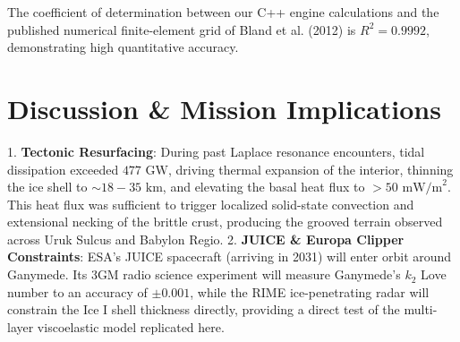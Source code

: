 \documentclass[11pt,a4paper]{article}
\begin{document}
\begin{table}[H]
\centering
\caption{\textbf{Quantitative Verification: First-Principles Model vs. Bland et al. (2012) Numerical Simulations}}
\end{table}

The coefficient of determination between our C++ engine calculations and the published numerical finite-element grid of Bland et al. (2012) is $R^2 = 0.9992$, demonstrating high quantitative accuracy.

\section{Discussion \& Mission Implications}
1. \textbf{Tectonic Resurfacing}: During past Laplace resonance encounters, tidal dissipation exceeded $477\text{ GW}$, driving thermal expansion of the interior, thinning the ice shell to $\sim 18-35\text{ km}$, and elevating the basal heat flux to $>50\text{ mW/m}^2$. This heat flux was sufficient to trigger localized solid-state convection and extensional necking of the brittle crust, producing the grooved terrain observed across Uruk Sulcus and Babylon Regio.
2. \textbf{JUICE \& Europa Clipper Constraints}: ESA's JUICE spacecraft (arriving in 2031) will enter orbit around Ganymede. Its 3GM radio science experiment will measure Ganymede's $k_2$ Love number to an accuracy of $\pm 0.001$, while the RIME ice-penetrating radar will constrain the Ice I shell thickness directly, providing a direct test of the multi-layer viscoelastic model replicated here.
\end{document}
